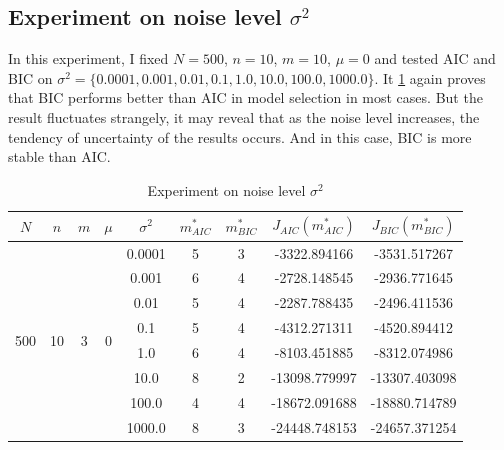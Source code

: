 \documentclass{article}
\begin{document}
\subsection{Experiment on noise level $\sigma^2$}
In this experiment, I fixed $N=500$, $n=10$, $m=10$, $\mu=0$ and tested AIC and BIC on $\sigma^2=\{0.0001, 0.001, 0.01, 0.1, 1.0, 10.0, 100.0, 1000.0\}$.
It \ref{ss} again proves that BIC performs better than AIC in model selection in most cases. 
But the result fluctuates strangely, it may reveal that as the noise level increases, the tendency of uncertainty of the results occurs. And in this case, BIC is more stable than AIC.
\begin{table}[htbp]
	\centering
	\newcommand{\tabincell}[2]{\begin{tabular}{@{}#1@{}}#2\end{tabular}}
	\renewcommand\arraystretch{1.0}
	\caption{Experiment on noise level $\sigma^2$}
	\label{ss}%
	\begin{tabular}{c|c|c|c|c|c|c|c|c}
    $N$ & $n$ & $m$ & $\mu$ & $\sigma^2$ & $m^*_{AIC}$ & $m^*_{BIC}$ & $J_{AIC}(m^*_{AIC})$ &$J_{BIC}(m^*_{BIC})$\\
    \hline
		\multirow{8}{*}{500} & \multirow{8}{*}{10} & \multirow{8}{*}{3} & \multirow{8}{*}{0} & 0.0001 & 5 & 3 & -3322.894166 & -3531.517267\\
     & & & & 0.001 & 6 & 4 & -2728.148545 & -2936.771645\\
     & & & & 0.01 & 5 & 4 & -2287.788435 & -2496.411536\\
     & & & & 0.1 & 5 & 4 & -4312.271311 & -4520.894412\\
     & & & & 1.0 & 6 & 4 & -8103.451885 & -8312.074986\\
     & & & & 10.0 & 8 & 2 & -13098.779997 & -13307.403098\\
     & & & & 100.0 & 4 & 4 & -18672.091688 & -18880.714789\\
     & & & & 1000.0 & 8 & 3 & -24448.748153 & -24657.371254\\
		\hline
\end{tabular}
\end{table}
\end{document}
